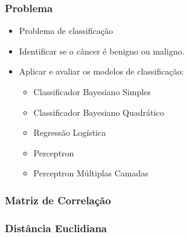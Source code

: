 \documentclass{beamer}
\begin{document}
\begin{frame}
\frametitle{Problema}
\begin{itemize}
\item Problema de classificação
\item Identificar se o câncer é benigno ou maligno.
\item Aplicar e avaliar os modelos de classificação:
\begin{itemize}
\item Classificador Bayesiano Simples
\item Classificador Bayesiano Quadrático
\item Regressão Logística
\item Perceptron
\item Perceptron Múltiplas Camadas
\end{itemize}
\end{itemize}
\end{frame}



\begin{frame}
\frametitle{Matriz de Correlação}
\begin{figure}[H]
    \centering
    \label{fig:corrcoef}
\end{figure}
\end{frame}


\begin{frame}
\frametitle{Distância Euclidiana}
\begin{figure}[H]
    \centering
    \label{fig:corrcoef}
\end{figure}
\end{frame}
\end{document}
